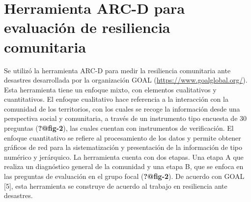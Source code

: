 \documentclass[
  letterpaper,
]{book}
\begin{document}
\section{Herramienta ARC-D para evaluación de resiliencia
comunitaria}\label{herramienta-arc-d-para-evaluaciuxf3n-de-resiliencia-comunitaria}

Se utilizó la herramienta ARC-D para medir la resiliencia comunitaria
ante desastres desarrollada por la organización GOAL
(\url{https://www.goalglobal.org/}). Esta herramienta tiene un enfoque
mixto, con elementos cualitativos y cuantitativos. El enfoque
cualitativo hace referencia a la interacción con la comunidad de los
territorios, con los cuales se recoge la información desde una
perspectiva social y comunitaria, a través de un instrumento tipo
encuesta de 30 preguntas (\textbf{?@fig-2}), las cuales cuentan con
instrumentos de verificación. El enfoque cuantitativo se refiere al
procesamiento de los datos y permite obtener gráficos de red para la
sistematización y presentación de la información de tipo numérico y
jerárquico. La herramienta cuenta con dos etapas. Una etapa A que
realiza un diagnóstico general de la comunidad y una etapa B, que se
enfoca en las preguntas de evaluación en el grupo focal
(\textbf{?@fig-2}). De acuerdo con GOAL {[}5{]}, esta herramienta se
construye de acuerdo al trabajo en resiliencia ante desastres.
\end{document}
